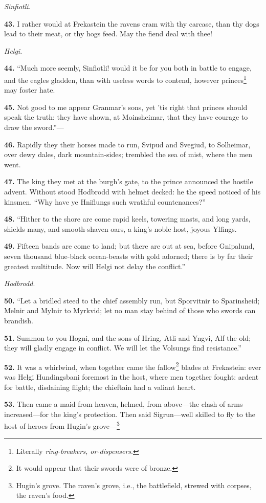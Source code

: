 \emph{Sinfiotli}.

\textbf{43.} I rather would at Frekastein the ravens cram with thy carcase,
than thy dogs lead to their meat, or thy hogs feed. May the fiend deal
with thee!

\emph{Helgi}.

\textbf{44.} ``Much more seemly, Sinfiotli! would it be for you both in battle
to engage, and the eagles gladden, than with useless words to contend,
however princes\footnote{Literally \emph{ring-breakers, or-dispensers}.} may foster hate.

\textbf{45.} Not good to me appear Granmar's sons, yet 'tis right that
princes should speak the truth: they have shown, at Moinsheimar, that
they have courage to draw the sword.''—

\textbf{46.} Rapidly they their horses made to run, Svipud and Svegiud, to
Solheimar, over dewy dales, dark mountain-sides; trembled the sea of
mist, where the men went.

\textbf{47.} The king they met at the burgh's gate, to the prince announced
the hostile advent. Without stood Hodbrodd with helmet decked: he the
speed noticed of his kinsmen. ``Why have ye Hniflungs such wrathful
countenances?''

\textbf{48.} ``Hither to the shore are come rapid keels, towering masts, and
long yards, shields many, and smooth-shaven oars, a king's noble host,
joyous Ylfings.

\textbf{49.} Fifteen bands are come to land; but there are out at sea, before
Gnipalund, seven thousand blue-black ocean-beasts with gold adorned;
there is by far their greatest multitude. Now will Helgi not delay the
conflict.''

\emph{Hodbrodd}.

\textbf{50.} ``Let a bridled steed to the chief assembly run, but Sporvitnir
to Sparinsheid; Melnir and Mylnir to Myrkvid; let no man stay behind
of those who swords can brandish.

\textbf{51.} Summon to you Hogni, and the sons of Hring, Atli and Yngvi, Alf
the old; they will gladly engage in conflict. We will let the Volsungs
find resistance.''

\textbf{52.} It was a whirlwind, when together came the fallow\footnote{It would appear that their swords were of bronze.} blades at
Frekastein: ever was Helgi Hundingsbani foremost in the host, where
men together fought: ardent for battle, disdaining flight; the
chieftain had a valiant heart.

\textbf{53.} Then came a maid from heaven, helmed, from above—the clash of
arms increased—for the king's protection. Then said Sigrun—well
skilled to fly to the host of heroes from Hugin's grove—\footnote{Hugin's grove. The raven's grove, i.e., the battlefield,
strewed with corpses, the raven's food.}

